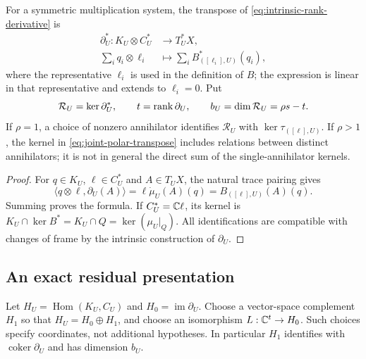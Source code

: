 \begin{proposition}\label{prop:joint-polar-relations}
For a symmetric multiplication system, the transpose of
\eqref{eq:intrinsic-rank-derivative} is
\begin{equation}\label{eq:joint-polar-transpose}
 \begin{split}
 \partial_U^*:K_U\otimes C_U^*&\longrightarrow T_U^*X,\\
 \sum_i q_i\otimes\ell_i&\longmapsto
                    \sum_i B_{([\ell_i],U)}^*(q_i),
 \end{split}
\end{equation}
where the representative $\ell_i$ is used in the definition of $B$;
the expression is linear in that representative and extends to
$\ell_i=0$. Put
\[
 \mathcal R_U=\ker\partial_U^*,\qquad t=\operatorname{rank}\partial_U,
 \qquad b_U=\dim\mathcal R_U=\rho s-t.
\]
If $\rho=1$, a choice of nonzero annihilator identifies
$\mathcal R_U$ with $\ker\tau_{([\ell],U)}$. If $\rho>1$, the
kernel in \eqref{eq:joint-polar-transpose} includes relations between
distinct annihilators; it is not in general the direct sum of the
single-annihilator kernels.
\end{proposition}
\begin{proof}
For $q\in K_U$, $\ell\in C_U^*$ and $A\in T_UX$, the natural
trace pairing gives
\[
 \langle q\otimes\ell,\partial_U(A)\rangle
        =\ell\dot\mu_U(A)(q)=B_{([\ell],U)}(A)(q).
\]
Summing proves the formula. If $C_U^*=\mathbb C\ell$, its kernel is
$K_U\cap\ker B^*=K_U\cap Q=\ker(\mu_U|_Q)$.
All identifications are compatible with changes of frame by the
intrinsic construction of $\partial_U$.
\end{proof}

\subsection{An exact residual presentation}
Let $H_U=\operatorname{Hom}(K_U,C_U)$ and
$H_0=\operatorname{im}\partial_U$. Choose a vector-space complement
$H_1$ so that $H_U=H_0\oplus H_1$, and choose an isomorphism
$L:\mathbb C^t\to H_0$. Such choices specify coordinates, not additional
hypotheses. In particular $H_1$ identifies with
$\operatorname{coker}\partial_U$ and has dimension $b_U$.


